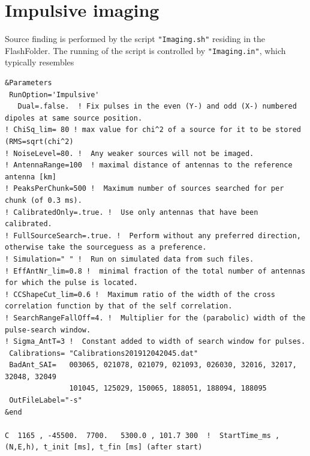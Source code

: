 \clearpage
\section{Impulsive imaging}

Source finding is performed by the script \verb!"Imaging.sh"! residing in the FlashFolder. The running of the script is controlled by \verb!"Imaging.in"!, which typically resembles


\begin{linenumbers}
\resetlinenumber
\begin{verbatim}
&Parameters
 RunOption='Impulsive'
   Dual=.false.  ! Fix pulses in the even (Y-) and odd (X-) numbered dipoles at same source position.
! ChiSq_lim= 80 ! max value for chi^2 of a source for it to be stored (RMS=sqrt(chi^2)
! NoiseLevel=80. !  Any weaker sources will not be imaged.
! AntennaRange=100	! maximal distance of antennas to the reference antenna [km]
! PeaksPerChunk=500 !  Maximum number of sources searched for per chunk (of 0.3 ms).
! CalibratedOnly=.true. !  Use only antennas that have been calibrated.
! FullSourceSearch=.true. !  Perform without any preferred direction, otherwise take the sourceguess as a preference.
! Simulation=" " !  Run on simulated data from such files.
! EffAntNr_lim=0.8 !  minimal fraction of the total number of antennas for which the pulse is located.
! CCShapeCut_lim=0.6 !  Maximum ratio of the width of the cross correlation function by that of the self correlation.
! SearchRangeFallOff=4. !  Multiplier for the (parabolic) width of the pulse-search window.
! Sigma_AntT=3 !  Constant added to width of search window for pulses.
 Calibrations= "Calibrations201912042045.dat"
 BadAnt_SAI=   003065, 021078, 021079, 021093, 026030, 32016, 32017, 32048, 32049
               101045, 125029, 150065, 188051, 188094, 188095
 OutFileLabel="-s"
&end

C  1165 , -45500.  7700.   5300.0 , 101.7 300  !  StartTime_ms , (N,E,h), t_init [ms], t_fin [ms] (after start)
\end{verbatim}
\end{linenumbers}


